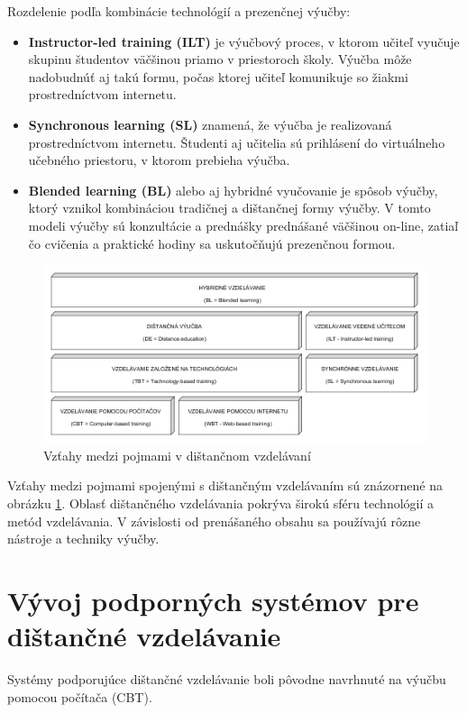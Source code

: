 \documentclass[10pt,oneside,slovak,a4paper]{article}
\begin{document}
Rozdelenie podľa kombinácie technológií a prezenčnej výučby:
\begin{itemize}
	\item \textbf{Instructor-led training (ILT)} je výučbový proces, v ktorom učiteľ vyučuje skupinu študentov väčšinou priamo v priestoroch školy. Výučba môže nadobudnúť aj takú formu, počas ktorej učiteľ komunikuje so žiakmi prostredníctvom internetu.
	\item \textbf{Synchronous learning (SL)} znamená, že výučba je realizovaná prostredníctvom internetu. Študenti aj učitelia sú prihlásení do virtuálneho učebného priestoru, v ktorom prebieha výučba.
	\item \textbf{Blended learning (BL)} alebo aj hybridné vyučovanie je spôsob výučby, ktorý vznikol kombináciou tradičnej a dištančnej formy výučby. V tomto modeli výučby sú konzultácie a prednášky prednášané väčšinou on-line, zatiaľ čo cvičenia a praktické hodiny sa uskutočňujú prezenčnou formou.
\end{itemize}


\begin{figure}[h]
	\centering
	\includegraphics[width=\textwidth]{Vztahy_DE.png}
	\caption{Vzťahy medzi pojmami v dištančnom vzdelávaní\cite{WiktorzakKotowski}}
	\label{Vztahy_medzi_pojmami}
\end{figure}

Vzťahy medzi pojmami spojenými s dištančným vzdelávaním sú znázornené na obrázku \ref{Vztahy_medzi_pojmami}.%
Oblasť dištančného vzdelávania pokrýva širokú sféru technológií a metód vzdelávania.
V závislosti od prenášaného obsahu sa používajú rôzne nástroje a techniky výučby.

\section{Vývoj podporných systémov pre dištančné vzdelávanie}
\label{Vyvojsys}
Systémy podporujúce dištančné vzdelávanie boli pôvodne navrhnuté na výučbu pomocou počítača (CBT)\cite{WiktorzakKotowski}.
\end{document}
